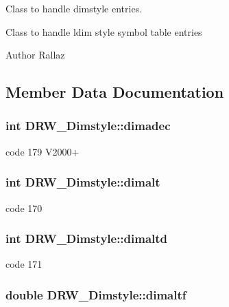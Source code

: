 Class to handle dimstyle entries. 

Class to handle ldim style symbol table entries \begin{DoxyAuthor}{Author}
Rallaz 
\end{DoxyAuthor}


\subsection{Member Data Documentation}
\hypertarget{classDRW__Dimstyle_a3954f6b5e068cb1fd157231af5680e81}{
\subsubsection[{dimadec}]{\setlength{\rightskip}{0pt plus 5cm}int D\-R\-W\-\_\-\-Dimstyle\-::dimadec}}\label{classDRW__Dimstyle_a3954f6b5e068cb1fd157231af5680e81}
code 179 V2000+ \hypertarget{classDRW__Dimstyle_a1e1e9ec596e0d157c75fffd91bd20df2}{
\subsubsection[{dimalt}]{\setlength{\rightskip}{0pt plus 5cm}int D\-R\-W\-\_\-\-Dimstyle\-::dimalt}}\label{classDRW__Dimstyle_a1e1e9ec596e0d157c75fffd91bd20df2}
code 170 \hypertarget{classDRW__Dimstyle_aefeeeccbe986c9484b59024c8bc40a98}{
\subsubsection[{dimaltd}]{\setlength{\rightskip}{0pt plus 5cm}int D\-R\-W\-\_\-\-Dimstyle\-::dimaltd}}\label{classDRW__Dimstyle_aefeeeccbe986c9484b59024c8bc40a98}
code 171 \hypertarget{classDRW__Dimstyle_a0ccbe896838b874d8bdf263b48e7cee6}{
\subsubsection[{dimaltf}]{\setlength{\rightskip}{0pt plus 5cm}double D\-R\-W\-\_\-\-Dimstyle\-::dimaltf}}\label{classDRW__Dimstyle_a0ccbe896838b874d8bdf263b48e7cee6}
